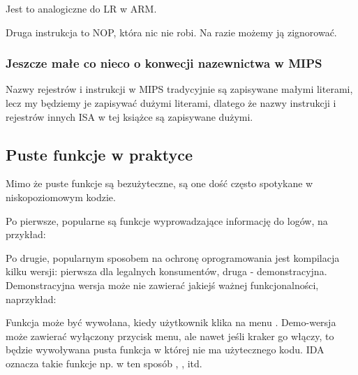 Jest to analogiczne do \ac{LR} w ARM.

Druga instrukcja to \ac{NOP}, która nic nie robi.
Na razie możemy ją zignorować.

\subsubsection{Jeszcze małe co nieco o konwecji nazewnictwa w MIPS}
Nazwy rejestrów i instrukcji w MIPS tradycyjnie są zapisywane małymi literami,
lecz my będziemy je zapisywać dużymi literami, dlatego że nazwy instrukcji i rejestrów innych 
\ac{ISA} w tej książce są zapisywane dużymi.

\subsection{Puste funkcje w praktyce}

Mimo że puste funkcje są bezużyteczne, są one dość często spotykane w niskopoziomowym kodzie.

Po pierwsze, popularne są funkcje wyprowadzające informację do logów, na przykład:



Po drugie, popularnym sposobem na ochronę oprogramowania jest kompilacja kilku wersji: pierwsza dla legalnych konsumentów, druga - demonstracyjna. Demonstracyjna wersja może nie zawierać jakiejś ważnej funkcjonalności, naprzykład:



Funkcja  może być wywołana, kiedy użytkownik klika na menu .
Demo-wersja może zawierać wyłączony przycisk menu, ale nawet jeśli kraker go włączy, to będzie wywoływana pusta funkcja w której nie ma użytecznego kodu.
IDA oznacza takie funkcje np. w ten sposób , , itd.


